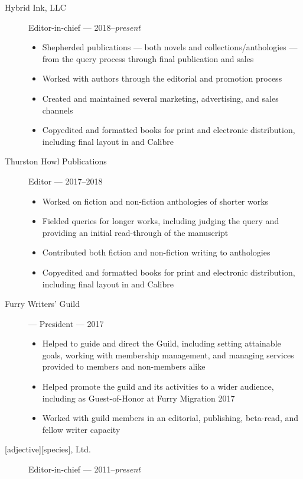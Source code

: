 \documentclass[letterpaper]{memoir}
\begin{document}
\begin{description}
\item[Hybrid Ink, LLC]
Editor-in-chief --- 2018--\emph{present}

\begin{itemize}
\tightlist
\item
  Shepherded publications --- both novels and collections/anthologies --- from the query process through final publication and sales
\item
  Worked with authors through the editorial and promotion process
\item
  Created and maintained several marketing, advertising, and sales channels
\item
  Copyedited and formatted books for print and electronic distribution, including final layout in \XeLaTeX and Calibre
\end{itemize}
\item[Thurston Howl Publications]
Editor --- 2017--2018

\begin{itemize}
\tightlist
\item
  Worked on fiction and non-fiction anthologies of shorter works
\item
  Fielded queries for longer works, including judging the query and
  providing an initial read-through of the manuscript
\item
  Contributed both fiction and non-fiction writing to anthologies
\item
  Copyedited and formatted books for print and electronic distribution, including final layout in \XeLaTeX and Calibre
\end{itemize}
\item[Furry Writers' Guild] --- President --- 2017

\begin{itemize}
  \item Helped to guide and direct the Guild, including setting attainable goals, working with membership management, and managing services provided to members and non-members alike
  \item Helped promote the guild and its activities to a wider audience, including as Guest-of-Honor at Furry Migration 2017
  \item Worked with guild members in an editorial, publishing, beta-read, and fellow writer capacity
\end{itemize}
\item[{[}adjective{]}{[}species{]}, Ltd.]
Editor-in-chief --- 2011--\emph{present}


\end{description}
\end{document}
